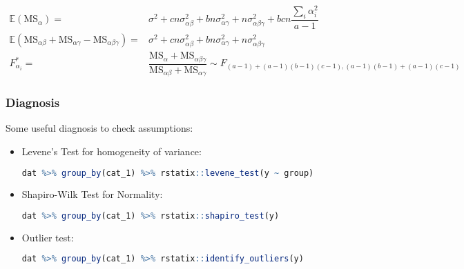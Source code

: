 \begin{enumerate}[topsep=2pt,itemsep=2pt]
    \begin{align}
        \mathbb{E}\left( \mathrm{MS}_\alpha   \right)=&\sigma ^2+cn\sigma ^2_{\alpha \beta }+bn\sigma ^2_{\alpha \gamma}+n\sigma ^2_{\alpha \beta \gamma }+bcn\dfrac{\sum_{i}\alpha _i^2}{a-1} \\
        \mathbb{E}\left( \mathrm{MS}_{\alpha \beta }+\mathrm{MS}_{\alpha \gamma }-\mathrm{MS}_{\alpha \beta \gamma }    \right)=& \sigma ^2+cn\sigma ^2_{\alpha \beta }+bn\sigma ^2_{\alpha \gamma}+n\sigma ^2_{\alpha \beta \gamma }\\
        F^*_{\alpha _i}=&\dfrac{\mathrm{MS}_\alpha+\mathrm{MS}_{\alpha \beta \gamma }}{\mathrm{MS}_{\alpha \beta }+\mathrm{MS}_{\alpha \gamma }}\sim F_{(a-1)+(a-1)(b-1)(c-1),(a-1)(b-1)+(a-1)(c-1)} 
    \end{align}

    
    
\end{enumerate}

    





\subsubsection{Diagnosis}

Some useful diagnosis to check assumptions:
\begin{itemize}[topsep=2pt,itemsep=0pt]
    \item Levene's Test for homogeneity of variance: 
    \begin{rcode}
    \begin{lstlisting}[language=R]
dat %>% group_by(cat_1) %>% rstatix::levene_test(y ~ group)
    \end{lstlisting}
    \end{rcode}
    \item Shapiro-Wilk Test for Normality:
    \begin{rcode}
    \begin{lstlisting}[language=R]
dat %>% group_by(cat_1) %>% rstatix::shapiro_test(y)
    \end{lstlisting}
    \end{rcode}
    \item Outlier test:
    \begin{rcode}
    \begin{lstlisting}[language=R]
dat %>% group_by(cat_1) %>% rstatix::identify_outliers(y)
    \end{lstlisting}
    \end{rcode}
\end{itemize}

